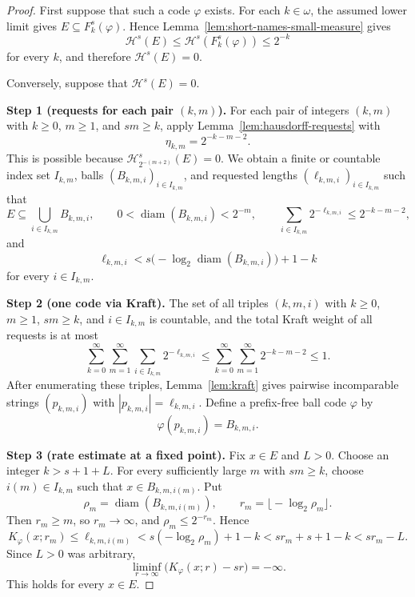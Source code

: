 \documentclass[10pt,a4paper]{amsart}
\DeclareMathOperator{\diam}{diam}
\begin{document}
\begin{proof}
First suppose that such a code \(\varphi\) exists.  For each \(k\in\omega\),
the assumed lower limit gives \(E\subseteq F_k^s(\varphi)\).  Hence
Lemma~\ref{lem:short-names-small-measure} gives
\[
\mathcal H^s(E)\le\mathcal H^s(F_k^s(\varphi))\le2^{-k}
\]
for every \(k\), and therefore \(\mathcal H^s(E)=0\).

Conversely, suppose that \(\mathcal H^s(E)=0\).

\smallskip
\noindent\textbf{Step 1 (requests for each pair \((k,m)\)).}
For each pair of integers
\((k,m)\) with \(k\ge0\), \(m\ge1\), and \(sm\ge k\), apply
Lemma~\ref{lem:hausdorff-requests} with
\[
\eta_{k,m}=2^{-k-m-2}.
\]
This is possible because \(\mathcal H^s_{2^{-(m+2)}}(E)=0\).  We obtain a finite
or countable index set \(I_{k,m}\), balls \((B_{k,m,i})_{i\in I_{k,m}}\), and
requested lengths \((\ell_{k,m,i})_{i\in I_{k,m}}\) such that
\[
E\subseteq\bigcup_{i\in I_{k,m}}B_{k,m,i},
\qquad
0<\diam(B_{k,m,i})<2^{-m},
\qquad
\sum_{i\in I_{k,m}}2^{-\ell_{k,m,i}}\le2^{-k-m-2},
\]
and
\[
\ell_{k,m,i}<s\bigl(-\log_2\diam(B_{k,m,i})\bigr)+1-k
\]
for every \(i\in I_{k,m}\).

\smallskip
\noindent\textbf{Step 2 (one code via Kraft).}
The set of all triples \((k,m,i)\) with \(k\ge0\), \(m\ge1\), \(sm\ge k\), and
\(i\in I_{k,m}\) is countable, and the total Kraft weight of all requests is at
most
\[
\sum_{k=0}^\infty\sum_{m=1}^\infty
\sum_{i\in I_{k,m}}2^{-\ell_{k,m,i}}
\le
\sum_{k=0}^\infty\sum_{m=1}^\infty 2^{-k-m-2}\le1.
\]
After enumerating these triples, Lemma~\ref{lem:kraft} gives pairwise
incomparable strings \((p_{k,m,i})\) with
\(|p_{k,m,i}|=\ell_{k,m,i}\).  Define a prefix-free ball code \(\varphi\) by
\[
\varphi(p_{k,m,i})=B_{k,m,i}.
\]

\smallskip
\noindent\textbf{Step 3 (rate estimate at a fixed point).}
Fix \(x\in E\) and \(L>0\).  Choose an integer \(k>s+1+L\).  For every
sufficiently large \(m\) with \(sm\ge k\), choose \(i(m)\in I_{k,m}\) such that
\(x\in B_{k,m,i(m)}\).  Put
\[
\rho_m=\diam(B_{k,m,i(m)}),
\qquad
r_m=\bigl\lfloor -\log_2\rho_m\bigr\rfloor .
\]
Then \(r_m\ge m\), so \(r_m\to\infty\), and \(\rho_m\le2^{-r_m}\).  Hence
\[
K_\varphi(x;r_m)
\le \ell_{k,m,i(m)}
< s(-\log_2\rho_m)+1-k
< sr_m+s+1-k
< sr_m-L.
\]
Since \(L>0\) was arbitrary,
\[
\liminf_{r\to\infty}\bigl(K_\varphi(x;r)-sr\bigr)=-\infty.
\]
This holds for every \(x\in E\).
\end{proof}
\end{document}
